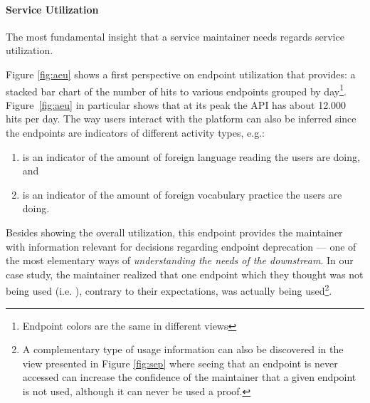 \documentclass{sig-alternate-05-2015}
\begin{document}
     



\paragraph{Service Utilization}
\label{sec:util}

The most fundamental insight that a service maintainer needs regards service utilization. %

Figure \ref{fig:aeu} shows a first perspective on endpoint utilization that \tool provides: a stacked bar chart of the number of hits to various endpoints grouped by day\footnote{Endpoint colors are the same in different views}. Figure~\ref{fig:aeu} in particular shows that at its peak the API has about 12.000 hits per day. 
The way users interact with the platform can also be inferred since the endpoints are indicators of different activity types, e.g.: 

\begin{enumerate}
	
	\item {\color{myred} \epTranslations} is an indicator of the amount of foreign language reading the users are doing, and 
	
	\item {\color{mygreen} \epOutcome} is an indicator of the amount of foreign vocabulary practice the users are doing.
	
\end{enumerate}



Besides showing the overall utilization, this endpoint provides the maintainer with information relevant for decisions regarding endpoint deprecation --- one of the most elementary ways of {\em understanding the needs of the downstream}\cite{Haen14a}. In our case study, the maintainer realized that one endpoint which they thought was not being used (i.e. ), contrary to their expectations, was actually being used\footnote{A complementary type of usage information can also be discovered in the view presented in Figure \ref{fig:sep} where seeing that an endpoint is never accessed can increase the confidence of the maintainer that a given endpoint is not used, although it can never be used a proof.}.
\end{document}
